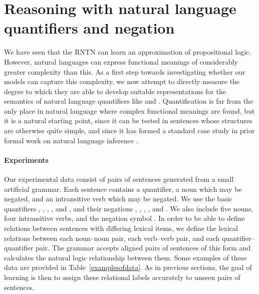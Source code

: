 \section{Reasoning with natural language quantifiers and negation}\label{sec:quantifiers}

We have seen that the RNTN can learn an approximation of propositional
logic.  However, natural languages can express functional meanings of
considerably greater complexity than this.  As a first step towards
investigating whether our models can capture this complexity, we now
attempt to directly measure the degree to which they are able to
develop suitable representations for the semantics of natural language
quantifiers like  and . Quantification is far from
the only place in natural language where complex functional meanings
are found, but it is a natural starting point, since it can be tested
in sentences whose structures are otherwise quite simple, and since it
has formed a standard case study in prior formal work on natural
language inference \cite{Icard:Moss:2013:LILT}.

\paragraph{Experiments}
Our experimental data consist of pairs of sentences generated from a
small artificial grammar. Each sentence contains a quantifier, a noun
which may be negated, and an intransitive verb which may be
negated. We use the basic quantifiers , , ,
, and , and their negations , ,
, , and . We also
include five nouns, four intransitive verbs, and the negation symbol
. In order to be able to define relations between sentences
with differing lexical items, we define the lexical relations between
each noun--noun pair, each verb--verb pair, and each
quantifier--quantifier pair. The grammar accepts aligned pairs of
sentences of this form and calculates the natural logic relationship
between them.  Some examples of these data are provided in
Table~\ref{examplesofdata}.  As in previous sections, the goal of
learning is then to assign these relational labels accurately to
unseen pairs of sentences.


